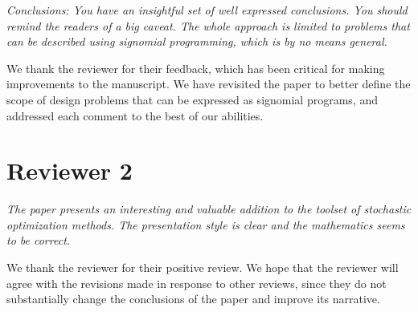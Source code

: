 \documentclass[11pt]{article}
\begin{document}
    \textit{Conclusions: You have an insightful set of well expressed conclusions.
    You should remind the readers of a big caveat. The whole approach is limited to problems
    that can be described using signomial programming, which is by no means general.}

    We thank the reviewer for their feedback, which has been critical for making improvements to the manuscript. We
    have revisited the paper to better define the scope of design problems that can be expressed as signomial
    programs, and addressed each comment to the best of our abilities.
    \bigskip

    \section{Reviewer 2}

    \textit{The paper presents an interesting and valuable addition to the toolset of stochastic optimization methods.
    The presentation style is clear and the mathematics seems to be correct.}

    We thank the reviewer for their positive review. We hope that the reviewer
    will agree with the revisions made in response to other reviews, since
    they do not substantially change the conclusions of the paper
    and improve its narrative.
    \bigskip
\end{document}
